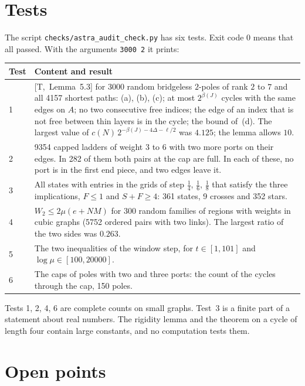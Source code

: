 \documentclass[11pt]{article}
\newcommand{\T}[1]{[T,~#1]}
\begin{document}
\section{Tests}\label{sec:tests}

The script \texttt{checks/astra\_audit\_check.py} has six tests. Exit code $0$ means that all
passed. With the arguments \texttt{3000 2} it prints:

\begin{center}\small
\begin{tabular}{@{}p{0.8cm}p{13.7cm}@{}}
\toprule
\textsf{\textbf{Test}} & \textsf{\textbf{Content and result}}\\
\midrule
1 & \T{Lemma~5.3} for 3000 random bridgeless $2$-poles of rank $2$ to $7$ and all 4157 shortest
paths: (a), (b), (c); at most $2^{\beta(J)}$ cycles with the same edges on $A$; no two
consecutive free indices; the edge of an index that is not free between thin layers is in the
cycle; the bound of~(d). The largest value of $c(N)\,2^{-\beta(J)-4\Delta-\ell/2}$ was $4.125$;
the lemma allows $10$.\\
2 & 9354 capped ladders of weight $3$ to $6$ with two more ports on their edges. In 282 of them
both pairs at the cap are full. In each of these, no port is in the first end piece, and two
edges leave it.\\
3 & All states with entries in the grids of step $\frac14$, $\frac16$, $\frac18$ that satisfy
the three implications, $F\le1$ and $S+F\ge4$: 361 states, 9 crosses and 352 stars.\\
4 & $W_2\le2\mu(e+NM)$ for 300 random families of regions with weights in cubic graphs (5752
ordered pairs with two links). The largest ratio of the two sides was $0.263$.\\
5 & The two inequalities of the window step, for $t\in[1,101]$ and $\log\mu\in[100,20000]$.\\
6 & The caps of poles with two and three ports: the count of the cycles through the cap, 150
poles.\\
\bottomrule
\end{tabular}
\end{center}

\noindent Tests 1, 2, 4, 6 are complete counts on small graphs. Test~3 is a finite part of a
statement about real numbers. The rigidity lemma and the theorem on a cycle of length four
contain large constants, and no computation tests them.

\section{Open points}\label{sec:open}
\end{document}
